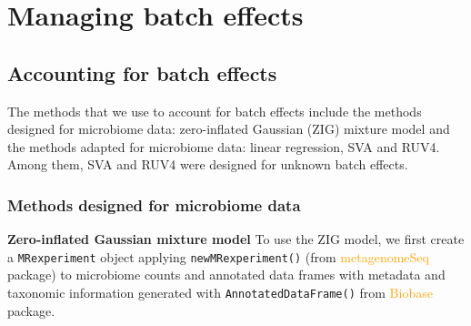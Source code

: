 \documentclass[
]{book}
\newenvironment{Shaded}{\begin{snugshade}}{\end{snugshade}}
\newcommand{\AttributeTok}[1]{\textcolor[rgb]{0.77,0.63,0.00}{#1}}
\newcommand{\CommentTok}[1]{\textcolor[rgb]{0.56,0.35,0.01}{\textit{#1}}}
\newcommand{\FunctionTok}[1]{\textcolor[rgb]{0.00,0.00,0.00}{#1}}
\newcommand{\NormalTok}[1]{#1}
\newcommand{\OtherTok}[1]{\textcolor[rgb]{0.56,0.35,0.01}{#1}}
\newcommand{\SpecialCharTok}[1]{\textcolor[rgb]{0.00,0.00,0.00}{#1}}
\begin{document}
\hypertarget{managing-batch-effects}{%
\section{Managing batch effects}\label{managing-batch-effects}}

\hypertarget{accnt}{%
\subsection{Accounting for batch effects}\label{accnt}}

The methods that we use to account for batch effects include the methods designed for microbiome data: zero-inflated Gaussian (ZIG) mixture model and the methods adapted for microbiome data: linear regression, SVA and RUV4. Among them, SVA and RUV4 were designed for unknown batch effects.

\hypertarget{methods-designed-for-microbiome-data}{%
\subsubsection{Methods designed for microbiome data}\label{methods-designed-for-microbiome-data}}

\textbf{Zero-inflated Gaussian mixture model} To use the ZIG model, we first create a \texttt{MRexperiment} object applying \texttt{newMRexperiment()} (from \textcolor{orange}{metagenomeSeq} package) to microbiome counts and annotated data frames with metadata and taxonomic information generated with \texttt{AnnotatedDataFrame()} from \textcolor{orange}{Biobase} package.

\begin{Shaded}
\end{Shaded}
\end{document}
